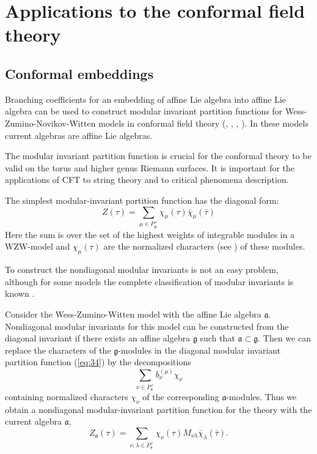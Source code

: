 \documentclass[12pt]{iopart}
\theoremstyle{definition}
\newcommand{\af}{\mathfrak{a}}
\begin{document}
\section{Applications to the conformal field theory}
\label{sec:phys-appl}

\subsection{Conformal embeddings}
\label{sec:conformal-embeddings}

Branching coefficients for an embedding of affine Lie algebra into
affine Lie algebra can be used to construct modular invariant
partition functions for Wess-Zumino-Novikov-Witten models in conformal field theory
(\cite{difrancesco1997cft}, \cite{Walton:1999xc}, \cite{walton1989conformal}, \cite{schellekens1986conformal}).
In these models current algebras are affine Lie algebras.

The modular invariant partition function is crucial for the conformal theory to be valid
on the torus and higher genus Riemann surfaces. It is important for the applications of
CFT to string theory and to critical phenomena description.

The simplest modular-invariant partition function has the diagonal form:
\begin{equation}
  \label{eq:34}
   Z(\tau)=\sum_{ \mu\in P^{+}_{\mathfrak{g}}} \chi_{\mu}(\tau)\bar \chi_{\mu}(\bar \tau)
\end{equation}
Here the sum is over the set of the highest weights of integrable modules in a WZW-model
and $\chi_{\mu}(\tau)$ are the normalized characters (see \cite{difrancesco1997cft}) of these modules.

To construct the nondiagonal modular invariants is not an easy problem,
although for some models the complete classification of modular invariants is known \cite{1994hepthGannon,1995JMPGannon}.

Consider the Wess-Zumino-Witten model with the affine Lie algebra $\af$.
Nondiagonal modular invariants for this model can be constructed from the diagonal
invariant if there exists an affine algebra $\mathfrak{g}$ such that $\af\subset\mathfrak{g}$.
Then we can replace the characters of the $\mathfrak{g}$-modules in the diagonal
modular invariant partition function (\ref{eq:34})
by the decompositions
\begin{equation*}
  \label{eq:32}
\sum_{\nu \in P^{+}_{\af}}b^{(\mu)}_{\nu} \chi_{\nu}
\end{equation*}
containing normalized characters $\chi_{\nu}$ of the corresponding $\af$-modules.
Thus we obtain a nondiagonal modular-invariant  partition function for the theory with
the current algebra $\af$,
\begin{equation}
  \label{eq:36}
   Z_{\af}(\tau)=\sum_{ \nu,\lambda\in P^{+}_{\af}} \chi_{\nu}(\tau)M_{\nu\lambda}\bar \chi_{\lambda}(\bar \tau).
\end{equation}
\end{document}
